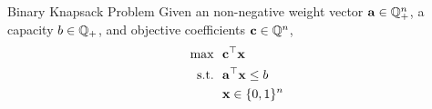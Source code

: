 
\begin{general}{Binary Knapsack Problem}{\npcomplete}
Given an non-negative weight vector $\mathbf{a} \in {\mathbb{Q}}^n_+$, a capacity $b \in {\mathbb{Q}}_+$, and objective coefficients $\mathbf{c} \in {\mathbb{Q}}^n$, 
\begin{equation}
\begin{split}
\max \ \ & \mathbf{c}^\top \mathbf{x}\\
\mbox{s.t.}\ \ & \mathbf{a}^\top \mathbf{x} \leq b\\
& \mathbf{x} \in \{0,1\}^n
\end{split}
\end{equation}
\end{general}
 


 

